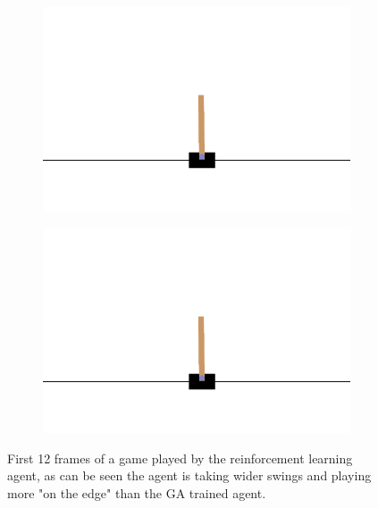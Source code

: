 \begin{figure}[H]
	\hfill
	\begin{subfigure}
		\centering
		\includegraphics[width=0.3\linewidth]{Images/frames/RL/11.png}
	\end{subfigure}
	\hfill
	\begin{subfigure}
		\centering
		\includegraphics[width=0.3\linewidth]{Images/frames/RL/12.png}
	\end{subfigure}
	\caption{First 12 frames of a game played by the reinforcement learning agent, as can be seen the agent is taking wider swings and playing more "on the edge" than the GA trained agent.}
	\label{fig:framesRL}
\end{figure}

